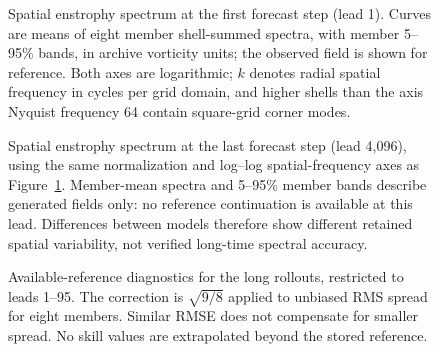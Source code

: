 \begin{figure}[t]
\centering
{}
\caption{Spatial enstrophy spectrum at the first forecast step (lead 1). Curves are means of eight member shell-summed spectra, with member 5--95\% bands, in archive vorticity units; the observed field is shown for reference. Both axes are logarithmic; $k$ denotes radial spatial frequency in cycles per grid domain, and higher shells than the axis Nyquist frequency 64 contain square-grid corner modes.}
\label{fig:long-spectrum-first}
\end{figure}

\begin{figure}[t]
\centering
{}
\caption{Spatial enstrophy spectrum at the last forecast step (lead 4,096), using the same normalization and log--log spatial-frequency axes as Figure~\ref{fig:long-spectrum-first}. Member-mean spectra and 5--95\% member bands describe generated fields only: no reference continuation is available at this lead. Differences between models therefore show different retained spatial variability, not verified long-time spectral accuracy.}
\label{fig:long-spectrum-last}
\end{figure}

\begin{figure}[t]
\centering
{}
\caption{Available-reference diagnostics for the long rollouts, restricted to leads 1--95. The correction is $\sqrt{9/8}$ applied to unbiased RMS spread for eight members. Similar RMSE does not compensate for smaller spread. No skill values are extrapolated beyond the stored reference.}
\label{fig:long-maps-skill}
\end{figure}
